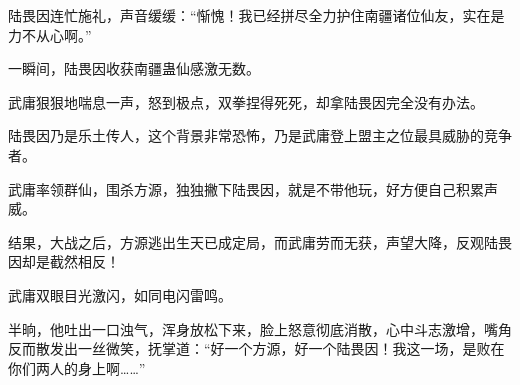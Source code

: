 \begin{this_body}
陆畏因连忙施礼，声音缓缓：“惭愧！我已经拼尽全力护住南疆诸位仙友，实在是力不从心啊。”

一瞬间，陆畏因收获南疆蛊仙感激无数。

武庸狠狠地喘息一声，怒到极点，双拳捏得死死，却拿陆畏因完全没有办法。

陆畏因乃是乐土传人，这个背景非常恐怖，乃是武庸登上盟主之位最具威胁的竞争者。

武庸率领群仙，围杀方源，独独撇下陆畏因，就是不带他玩，好方便自己积累声威。

结果，大战之后，方源逃出生天已成定局，而武庸劳而无获，声望大降，反观陆畏因却是截然相反！

武庸双眼目光激闪，如同电闪雷鸣。

半晌，他吐出一口浊气，浑身放松下来，脸上怒意彻底消散，心中斗志激增，嘴角反而散发出一丝微笑，抚掌道：“好一个方源，好一个陆畏因！我这一场，是败在你们两人的身上啊……”

\end{this_body}

